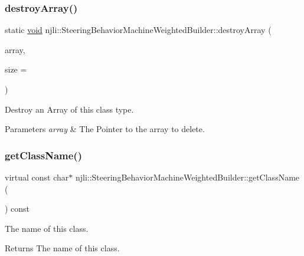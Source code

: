 \subsubsection{\texorpdfstring{destroy\+Array()}{destroyArray()}}
{\footnotesize\ttfamily static \mbox{\hyperlink{_thread_8h_af1e856da2e658414cb2456cb6f7ebc66}{void}} njli\+::\+Steering\+Behavior\+Machine\+Weighted\+Builder\+::destroy\+Array (\begin{DoxyParamCaption}\item[{\mbox{\hyperlink{classnjli_1_1_steering_behavior_machine_weighted_builder}{Steering\+Behavior\+Machine\+Weighted\+Builder}} $\ast$$\ast$}]{array,  }\item[{const \mbox{\hyperlink{_util_8h_a10e94b422ef0c20dcdec20d31a1f5049}{u32}}}]{size = {} }\end{DoxyParamCaption})\hspace{0.3cm}{\ttfamily [static]}}

Destroy an Array of this class type.


\begin{DoxyParams}{Parameters}
{\em array} & The Pointer to the array to delete. \\
\hline
\end{DoxyParams}
\mbox{\label{classnjli_1_1_steering_behavior_machine_weighted_builder_a76a5cedafd99c9c5b238f59de83e7e2f}} 
\subsubsection{\texorpdfstring{get\+Class\+Name()}{getClassName()}}
{\footnotesize\ttfamily virtual const char$\ast$ njli\+::\+Steering\+Behavior\+Machine\+Weighted\+Builder\+::get\+Class\+Name (\begin{DoxyParamCaption}{ }\end{DoxyParamCaption}) const\hspace{0.3cm}{\ttfamily [virtual]}}

The name of this class.

\begin{DoxyReturn}{Returns}
The name of this class. 
\end{DoxyReturn}


